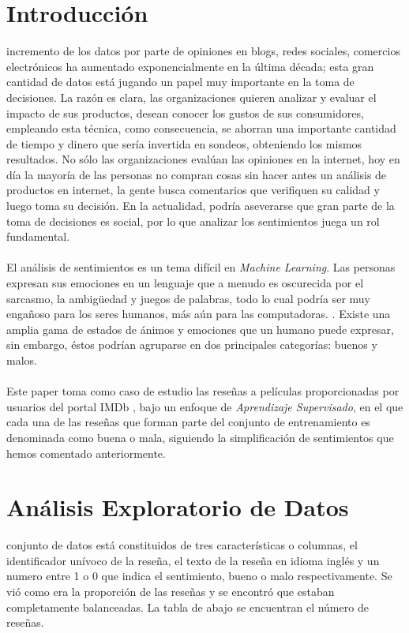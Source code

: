 \documentclass{sciposter}
\begin{document}
\begin{multicols}{3}
\section{Introducci\'on}
 incremento de los datos por parte de opiniones en blogs, redes sociales, comercios electr\'onicos ha aumentado exponencialmente en la \'ultima d\'ecada; esta gran cantidad de datos est\'a jugando un papel muy importante en la toma de decisiones. La raz\'on es clara, las organizaciones quieren analizar y evaluar el impacto de sus productos, desean conocer los gustos de sus consumidores, empleando esta t\'ecnica, como consecuencia, se ahorran una importante cantidad de tiempo y dinero que ser\'ia invertida en sondeos, obteniendo los mismos resultados. No s\'olo las organizaciones eval\'uan las opiniones en la internet, hoy en d\'ia la mayor\'ia de las personas no compran cosas sin hacer antes un an\'alisis de productos en internet, la gente busca comentarios que verifiquen su calidad y luego toma su decisi\'on. En la actualidad, podr\'ia aseverarse que gran parte de la toma de decisiones es social, por lo que analizar los sentimientos juega un rol fundamental.
\\\\
El an\'alisis de sentimientos es un tema dif\'icil en \emph{Machine Learning}. Las personas expresan sus emociones en un lenguaje que a menudo es oscurecida por el sarcasmo, la ambig\"uedad y juegos de palabras, todo lo cual podr\'ia ser muy engañoso para los seres humanos, más aún para las computadoras. \cite{Kaggle:2014}. Existe una amplia gama de estados de \'animos y emociones que un humano puede expresar, sin embargo, \'estos podr\'ian agruparse en dos principales categor\'ias: buenos y malos.
\\\\
Este paper toma como caso de estudio las reseñas a pel\'iculas proporcionadas por usuarios del portal IMDb \cite{IMDb:2016}, bajo un enfoque de \emph{Aprendizaje Supervisado}, en el que cada una de las reseñas que forman parte del conjunto de entrenamiento es denominada como buena o mala, siguiendo la simplificaci\'on de sentimientos que hemos comentado anteriormente.

\section{An\'alisis Exploratorio de Datos}
  conjunto de datos est\'a constituidos de tres caracter\'isticas o columnas, el identificador un\'ivoco de la reseña, el texto de la reseña en idioma ingl\'es y un numero entre 1 o 0 que indica el sentimiento, bueno o malo respectivamente. Se vi\'o como era la proporci\'on de las reseñas y se encontr\'o que estaban completamente balanceadas. La tabla de abajo se encuentran el n\'umero de reseñas.


\end{multicols}
\end{document}
